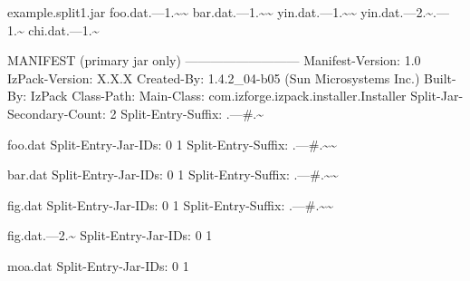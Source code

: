 \documentclass[a4paper, 12pt, pdftex]{report}
\begin{document}
    example.split1.jar    foo.dat.---1.\~{}\~{}
                          bar.dat.---1.\~{}\~{}
                          yin.dat.---1.\~{}\~{}
                          yin.dat.---2.\~{}.---1.\~{}
                          chi.dat.---1.\~{}

MANIFEST (primary jar only)
---------------------------
    Manifest-Version: 1.0
    IzPack-Version: X.X.X
    Created-By: 1.4.2\_04-b05 (Sun Microsystems Inc.)
    Built-By: IzPack
    Class-Path: 
    Main-Class: com.izforge.izpack.installer.Installer
    Split-Jar-Secondary-Count: 2
    Split-Entry-Suffix: .---\#.\~{}

    foo.dat
    Split-Entry-Jar-IDs: 0 1
    Split-Entry-Suffix: .---\#.\~{}\~{}

    bar.dat
    Split-Entry-Jar-IDs: 0 1
    Split-Entry-Suffix: .---\#.\~{}\~{}

    fig.dat
    Split-Entry-Jar-IDs: 0 1
    Split-Entry-Suffix: .---\#.\~{}\~{}

    fig.dat.---2.\~{}
    Split-Entry-Jar-IDs: 0 1

    moa.dat
    Split-Entry-Jar-IDs: 0 1 
\end{document}
